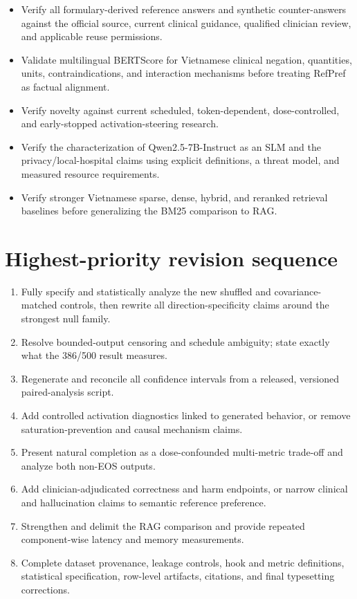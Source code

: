 \documentclass[11pt]{article}
\begin{document}
\begin{itemize}
    \item Verify all formulary-derived reference answers and synthetic counter-answers against the official source, current clinical guidance, qualified clinician review, and applicable reuse permissions.
    \item Validate multilingual BERTScore for Vietnamese clinical negation, quantities, units, contraindications, and interaction mechanisms before treating RefPref as factual alignment.
    \item Verify novelty against current scheduled, token-dependent, dose-controlled, and early-stopped activation-steering research.
    \item Verify the characterization of Qwen2.5-7B-Instruct as an SLM and the privacy/local-hospital claims using explicit definitions, a threat model, and measured resource requirements.
    \item Verify stronger Vietnamese sparse, dense, hybrid, and reranked retrieval baselines before generalizing the BM25 comparison to RAG.
\end{itemize}

\section*{Highest-priority revision sequence}

\begin{enumerate}
    \item Fully specify and statistically analyze the new shuffled and covariance-matched controls, then rewrite all direction-specificity claims around the strongest null family.
    \item Resolve bounded-output censoring and schedule ambiguity; state exactly what the 386/500 result measures.
    \item Regenerate and reconcile all confidence intervals from a released, versioned paired-analysis script.
    \item Add controlled activation diagnostics linked to generated behavior, or remove saturation-prevention and causal mechanism claims.
    \item Present natural completion as a dose-confounded multi-metric trade-off and analyze both non-EOS outputs.
    \item Add clinician-adjudicated correctness and harm endpoints, or narrow clinical and hallucination claims to semantic reference preference.
    \item Strengthen and delimit the RAG comparison and provide repeated component-wise latency and memory measurements.
    \item Complete dataset provenance, leakage controls, hook and metric definitions, statistical specification, row-level artifacts, citations, and final typesetting corrections.
\end{enumerate}
\end{document}
